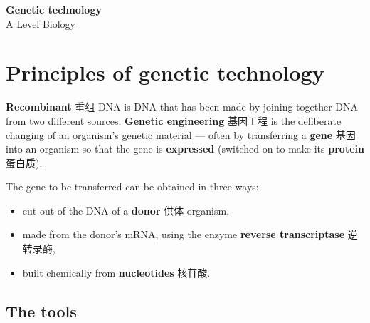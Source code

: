 \documentclass[11pt]{article}
\begin{document}
\begin{center}
  {\LARGE\bfseries Genetic technology}\\[0.35em]
  {\large A Level Biology}
\end{center}
\vspace{0.6em}

\section*{Principles of genetic technology}

\textbf{Recombinant} 重组 DNA is DNA that has been made by joining together DNA from two different sources. \textbf{Genetic engineering} 基因工程 is the deliberate changing of an organism's genetic material — often by transferring a \textbf{gene} 基因 into an organism so that the gene is \textbf{expressed} (switched on to make its \textbf{protein} 蛋白质).

The gene to be transferred can be obtained in three ways:

\begin{itemize}
\item cut out of the DNA of a \textbf{donor} 供体 organism,

\item made from the donor's mRNA, using the enzyme \textbf{reverse transcriptase} 逆转录酶,

\item built chemically from \textbf{nucleotides} 核苷酸.

\end{itemize}

\subsection*{The tools}

\begin{center}
\end{center}
\end{document}
